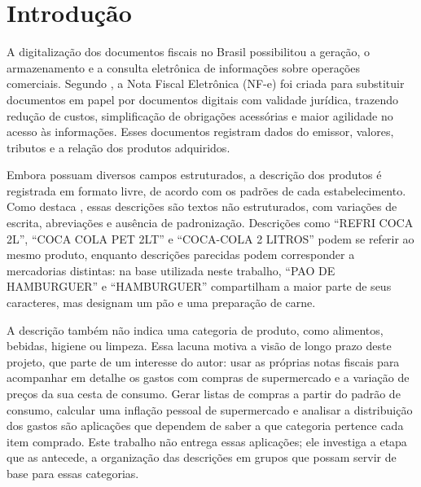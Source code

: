 \documentclass[english,brazilian]{UNISINOSmonografia}
\begin{document}
\tableofcontents




\chapter{Introdução}

A digitalização dos documentos fiscais no Brasil possibilitou a geração, o armazenamento e a consulta eletrônica de informações sobre operações comerciais. Segundo \cite{sefazrsnfe}, a Nota Fiscal Eletrônica (NF-e) foi criada para substituir documentos em papel por documentos digitais com validade jurídica, trazendo redução de custos, simplificação de obrigações acessórias e maior agilidade no acesso às informações. Esses documentos registram dados do emissor, valores, tributos e a relação dos produtos adquiridos.

Embora possuam diversos campos estruturados, a descrição dos produtos é registrada em formato livre, de acordo com os padrões de cada estabelecimento. Como destaca , essas descrições são textos não estruturados, com variações de escrita, abreviações e ausência de padronização. Descrições como ``REFRI COCA 2L'', ``COCA COLA PET 2LT'' e ``COCA-COLA 2 LITROS'' podem se referir ao mesmo produto, enquanto descrições parecidas podem corresponder a mercadorias distintas: na base utilizada neste trabalho, ``PAO DE HAMBURGUER'' e ``HAMBURGUER'' compartilham a maior parte de seus caracteres, mas designam um pão e uma preparação de carne.

A descrição também não indica uma categoria de produto, como alimentos, bebidas, higiene ou limpeza. Essa lacuna motiva a visão de longo prazo deste projeto, que parte de um interesse do autor: usar as próprias notas fiscais para acompanhar em detalhe os gastos com compras de supermercado e a variação de preços da sua cesta de consumo. Gerar listas de compras a partir do padrão de consumo, calcular uma inflação pessoal de supermercado e analisar a distribuição dos gastos são aplicações que dependem de saber a que categoria pertence cada item comprado. Este trabalho não entrega essas aplicações; ele investiga a etapa que as antecede, a organização das descrições em grupos que possam servir de base para essas categorias.
\end{document}

